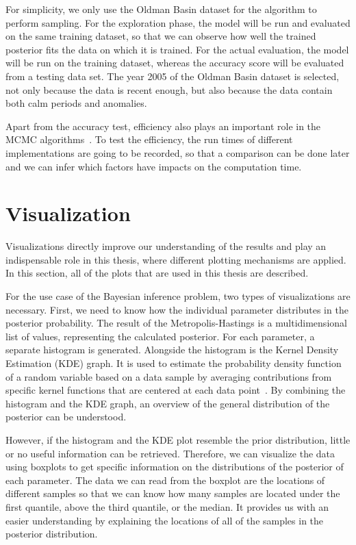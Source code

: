 For simplicity, we only use the Oldman Basin dataset for the algorithm to perform sampling. For the exploration phase, the model will be run and evaluated on the same training dataset, so that we can observe how well the trained posterior fits the data on which it is trained. For the actual evaluation, the model will be run on the training dataset, whereas the accuracy score will be evaluated from a testing data set. The year 2005 of the Oldman Basin dataset is selected, not only because the data is recent enough, but also because the data contain both calm periods and anomalies. 

Apart from the accuracy test, efficiency also plays an important role in the MCMC algorithms~\cite{MCMC_efficiency}. To test the efficiency, the run times of different implementations are going to be recorded, so that a comparison can be done later and we can infer which factors have impacts on the computation time.

\section{Visualization}
Visualizations directly improve our understanding of the results and play an indispensable role in this thesis, where different plotting mechanisms are applied. In this section, all of the plots that are used in this thesis are described.

For the use case of the Bayesian inference problem, two types of visualizations are necessary. First, we need to know how the individual parameter distributes in the posterior probability. The result of the Metropolis-Hastings is a multidimensional list of values, representing the calculated posterior. For each parameter, a separate histogram is generated. Alongside the histogram is the Kernel Density Estimation (KDE) graph. It is used to estimate the probability density function of a random variable based on a data sample by averaging contributions from specific kernel functions that are centered at each data point~\cite{kde}. By combining the histogram and the KDE graph, an overview of the general distribution of the posterior can be understood.

However, if the histogram and the KDE plot resemble the prior distribution, little or no useful information can be retrieved. Therefore, we can visualize the data using boxplots to get specific information on the distributions of the posterior of each parameter. The data we can read from the boxplot are the locations of different samples so that we can know how many samples are located under the first quantile, above the third quantile, or the median. It provides us with an easier understanding by explaining the locations of all of the samples in the posterior distribution.

